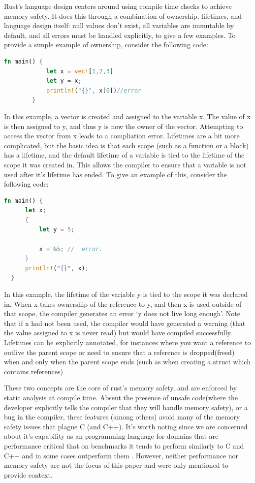 \documentclass[conference]{IEEEtran}
\begin{document}
 {
  Rust's language design centers around using compile time checks to achieve memory safety. It does this through a combination of ownership, lifetimes, and language design itself:
  null values don't exist, all variables are immutable by default, and all errors must be handled explicitly, to give a few examples. To provide a simple example of ownership, consider the following code:
  \begin{lstlisting}[language=Rust]
    fn main() {
            let x = vec![1,2,3]
            let y = x;
            println!("{}", x[0])//error 
        }
    \end{lstlisting}
  In this example, a vector is created and assigned to the variable x. The value of x is then assigned to y, and thus y is now the owner of the vector. Attempting to access the vector from x leads to a compliation error.
  Lifetimes are a bit more complicated, but the basic idea is that each scope (such as a function or a block) has a lifetime, and the default lifetime of a variable is tied to the lifetime of the scope it was created in. This allows the compiler to
  ensure that a variable is not used after it's lifetime has ended. To give an example of this, consider the following code:
  \begin{lstlisting}[language=Rust]
  fn main() {
      let x;                                       
      {                         
          let y = 5;           

          x = &5; //  error.
      }                    
      println!("{}", x);       
  }                             
      \end{lstlisting}
 }{

  In this example, the lifetime of the variable y is tied to the scope it was declared in. When x takes ownership of the reference to y, and then x is used outside of that scope, the compiler generates an error `y does not live long enough'. Note that
  if x had not been used, the compiler would have generated a warning (that the value assigned to x is never read) but would have compiled successfully. Lifetimes can be explicitly annotated, for instances where you want a reference to outlive the parent
  scope or need to ensure that a reference is dropped(freed) when and only when the parent scope ends (such as when creating a struct which contains references)
 }

 {
  These two concepts are the core of rust's memory safety, and are enforced by static analysis at compile time. Absent the presence of unsafe code(where the developer explicitly tells the compiler that they will handle memory safety), or a bug in the compiler, these features (among others) avoid many of the memory safety issues that plague C (and C++).
  It's worth noting since we are concerned about it's capability as an programming language for domains that are performance critical that on benchmarks it tends to perform similarly to C and C++\cite{costanzoPerformanceVsProgramming2021} and in some cases outperform them \cite{rooneyEvaluatingFFTPerformance2023a}. However, neither performance nor memory safety are not the focus of this paper and were only mentioned to provide context.
 }
\end{document}
